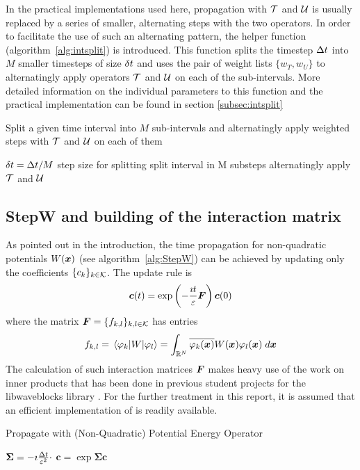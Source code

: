 %
In the practical implementations used here, propagation with $\mathcal{T}$ and $\mathcal{U}$ is usually replaced by a series of smaller, alternating steps with the two operators.
In order to facilitate the use of such an alternating pattern, the helper function  (algorithm~\ref{alg:intsplit}) is introduced.
This function splits the timestep $\Delta t$ into $M$ smaller timesteps of size $\delta t$ and uses the pair of weight lists $\{ w_T, w_U \}$ to alternatingly apply operators $\mathcal{T}$ and $\mathcal{U}$ on each of the sub-intervals.
More detailed information on the individual parameters to this function and the practical implementation can be found in section \ref{subsec:intsplit}
%
\begin{algorithm}[h]
	\caption{Split a given time interval into $M$ sub-intervals and alternatingly apply weighted steps with $\mathcal{T}$ and $\mathcal{U}$ on each of them}
	\label{alg:intsplit}
	\begin{algorithmic}
		\State
			\State
			\State $\delta t = \Delta t/M$
			\Comment step size for splitting
			\Comment split interval in M substeps
				\Comment alternatingly apply $\mathcal{T}$ and $\mathcal{U}$
					\State {}
					\State {}
				\EndFor
			\EndFor
		\State
		\EndProcedure
	\end{algorithmic}
\end{algorithm}


\subsection{StepW and building of the interaction matrix}
%
As pointed out in the introduction, the time propagation for non-quadratic potentials $W(\bm{x})$ (see algorithm~\ref{alg:StepW}) can be achieved by updating only the coefficients $\{ c_k \}_{k \in \mathcal{K}}$.
The update rule is
%
\begin{align}
	\bm{c}(t) = \exp \left( - \frac{\imath t}{\varepsilon} \bm{F} \right) \bm{c}(0)
\end{align}
%
where the matrix $\bm{F} = \{ f_{k,l} \}_{k,l \in \mathcal{K}}$ has entries
%
\begin{align}
	f_{k,l} = \matrixel{\varphi_k}{W}{\varphi_l}
	= \int_{\R^N} \conj{\varphi_k(\bvec{x})} W(\bvec{x}) \varphi_l(\bvec{x}) \; \dif \bvec{x}
\end{align}
%
The calculation of such interaction matrices $\bm{F}$ makes heavy use of the work on inner products that has been done in previous student projects for the libwaveblocks library \cite{libwaveblocks}.
For the further treatment in this report, it is assumed that an efficient implementation of  is readily available.
%
\begin{algorithm}[h]
	\caption{Propagate with (Non-Quadratic) Potential Energy Operator}
	\label{alg:StepW}
	\begin{algorithmic}
		\State
		\Procedure{StepW}{$\upic,\Dt$}
			\State $\bm{\Sigma} = - \imath \frac{\Delta t}{\varepsilon^2} \cdot$ \Call{BuildF}{$\Pi$}
			\State $\bm{c} = \exp{\bm{\Sigma}} \bm{c}$
		\EndProcedure
		\State
	\end{algorithmic}
\end{algorithm}
